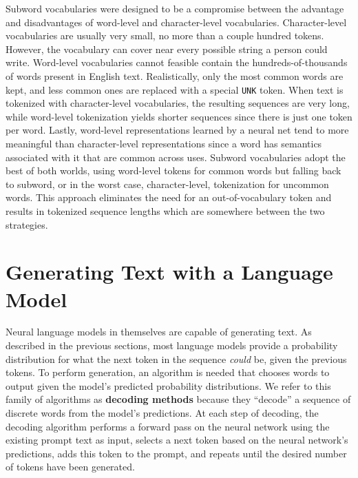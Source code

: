 Subword vocabularies were designed to be a compromise between the advantage and disadvantages of word-level and character-level vocabularies.
Character-level vocabularies are usually very small, no more than a couple hundred tokens.
However, the vocabulary can cover near every possible string a person could write.
Word-level vocabularies cannot feasible contain the hundreds-of-thousands of words present in English text.
Realistically, only the most common words are kept, and less common ones are replaced with a special \texttt{UNK} token.
When text is tokenized with character-level vocabularies, the resulting sequences are very long, while word-level tokenization yields shorter sequences since there is just one token per word.
Lastly, word-level representations learned by a neural net tend to more meaningful than character-level representations since a word has semantics associated with it that are common across uses.
Subword vocabularies adopt the best of both worlds, using word-level tokens for common words but falling back to subword, or in the worst case, character-level, tokenization for uncommon words.
This approach eliminates the need for an out-of-vocabulary token and results in tokenized sequence lengths which are somewhere between the two strategies.


\section{Generating Text with a Language Model}
\label{section:background_gen}

Neural language models in themselves are capable of generating text.
As described in the previous sections, most language models provide a probability distribution for what the next token in the sequence \textit{could} be, given the previous tokens.
To perform generation, an algorithm is needed that chooses words to output given the model's predicted probability distributions.
We refer to this family of algorithms as \textbf{decoding methods} because they ``decode'' a sequence of discrete words from the model's predictions.
At each step of decoding, the decoding algorithm performs a forward pass on the neural network using the existing prompt text as input, selects a next token based on the neural network's predictions, adds this token to the prompt, and repeats until the desired number of tokens have been generated.

